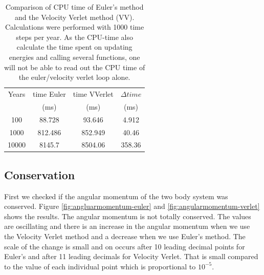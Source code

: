 \begin{table}[H]\caption{Comparison of CPU time of Euler's method and the Velocity Verlet method (VV). Calculations were performed with 1000 time steps per year. As the CPU-time also calculate the time spent on updating energies and calling several functions, one will not be able to read out the CPU time of the euler/velocity verlet loop alone.}\label{tab:CPUtime}
	\begin{tabular}[width=\linewidth]{cccc}
		Years &\small{ time Euler  } & \small{time VVerlet} & \small{$\Delta time $} \\
		& (ms)&(ms) &(ms)\\ \hline 
		    
		100 & 88.728 & 93.646 & 4.912 \\
		1000 & 812.486 & 852.949   &40.46\\	
		10000 & 	8145.7  & 8504.06   &358.36
	\end{tabular}
\end{table}

%	

\subsection{Conservation}

First we checked if the angular momentum of the two body system was conserved. Figure \ref{fig:angluarmomentum-euler} and \ref{fig:angularmomentum-verlet} shows the results. The angular momentum is not totally conserved. The values are oscillating and there is an increase in the angular momentum when we use the Velocity Verlet method and a decrease when we use Euler's method. The scale of the change is small and on occurs after 10 leading decimal points for   Euler's and after 11 leading decimals  for Velocity Verlet. That is small compared to the value of each individual point which is  proportional to $10^{-5}$.

